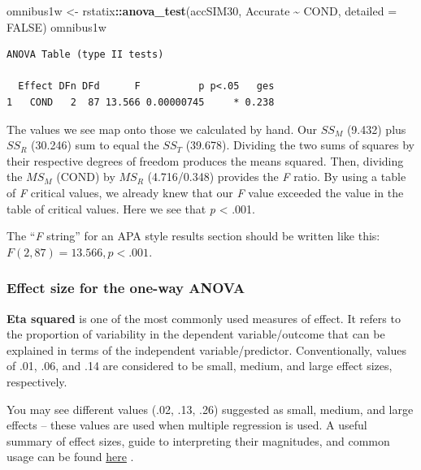 \documentclass[
  11pt,
]{book}
\newenvironment{Shaded}{\begin{snugshade}}{\end{snugshade}}
\newcommand{\AttributeTok}[1]{\textcolor[rgb]{0.27,0.27,0.27}{#1}}
\newcommand{\ConstantTok}[1]{\textcolor[rgb]{0.37,0.37,0.37}{#1}}
\newcommand{\FunctionTok}[1]{\textcolor[rgb]{0.27,0.27,0.27}{\textbf{#1}}}
\newcommand{\NormalTok}[1]{#1}
\newcommand{\OtherTok}[1]{\textcolor[rgb]{0.37,0.37,0.37}{#1}}
\newcommand{\SpecialCharTok}[1]{\textcolor[rgb]{0.43,0.43,0.43}{\textbf{#1}}}
\begin{document}
\begin{Shaded}
\begin{Highlighting}[]
\NormalTok{omnibus1w }\OtherTok{\textless{}{-}}\NormalTok{ rstatix}\SpecialCharTok{::}\FunctionTok{anova\_test}\NormalTok{(accSIM30, Accurate }\SpecialCharTok{\textasciitilde{}}\NormalTok{ COND, }\AttributeTok{detailed =} \ConstantTok{FALSE}\NormalTok{)}
\NormalTok{omnibus1w}
\end{Highlighting}
\end{Shaded}

\begin{verbatim}
ANOVA Table (type II tests)

  Effect DFn DFd      F          p p<.05   ges
1   COND   2  87 13.566 0.00000745     * 0.238
\end{verbatim}

The values we see map onto those we calculated by hand. Our \(SS_M\) (9.432) plus \(SS_R\) (30.246) sum to equal the \(SS_T\) (39.678). Dividing the two sums of squares by their respective degrees of freedom produces the means squared. Then, dividing the \(MS_M\) (COND) by \(MS_R\) (4.716/0.348) provides the \emph{F} ratio. By using a table of \emph{F} critical values, we already knew that our \emph{F} value exceeded the value in the table of critical values. Here we see that \emph{p} \textless{} .001.

The ``\emph{F} string'' for an APA style results section should be written like this: \(F(2,87) = 13.566, p < .001\).

\hypertarget{effect-size-for-the-one-way-anova}{%
\subsubsection{Effect size for the one-way ANOVA}\label{effect-size-for-the-one-way-anova}}

\textbf{Eta squared} is one of the most commonly used measures of effect. It refers to the proportion of variability in the dependent variable/outcome that can be explained in terms of the independent variable/predictor. Conventionally, values of .01, .06, and .14 are considered to be small, medium, and large effect sizes, respectively.

You may see different values (.02, .13, .26) suggested as small, medium, and large effects -- these values are used when multiple regression is used. A useful summary of effect sizes, guide to interpreting their magnitudes, and common usage can be found \href{https://imaging.mrc-cbu.cam.ac.uk/statswiki/FAQ/effectSize}{here} \citep{watson_rules_2020}.
\end{document}

